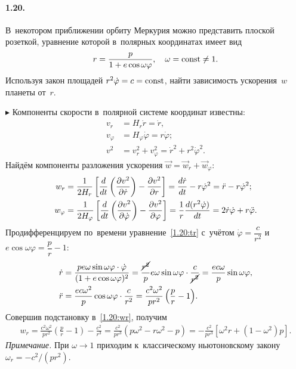 \documentclass{weekly}
\begin{document}

\paragraph{1.20.} В~некотором приближении орбиту Меркурия
можно представить плоской розеткой, уравнение которой
в~полярных координатах имеет вид
\begin{equation}\label{1.20:tr}
    r = \frac{p}{1+e\cos\omega\varphi}, \quad
    \omega = \mathrm{const} \neq 1.
\end{equation}
Используя закон площадей $r^2 \dot\varphi = c = \mathrm{const}$,
найти зависимость ускорения~$w$ планеты от~$r$.

$\blacktriangleright$ Компоненты скорости
в~полярной системе координат известны:
\begin{align}
    v_r &= H_r \dot r = \dot r, \label{1.20:vr}\\
    v_\varphi &= H_\varphi \dot\varphi = r \dot\varphi;
        \label{1.20:vphi}\\
    v^2 &= v_r^2 + v_\varphi^2 = \dot r^2 + r^2 \dot\varphi^2.
\end{align}
Найдём компоненты разложения ускорения
$\vec w = \vec w_r + \vec w_\varphi$:
\begin{align}
    w_r &= \frac{1}{2H_r}
            \left[ \frac{d }{d t} \left(\frac{\partial v^2}{\partial \dot r}\right) -
            \frac{\partial v^2}{\partial r} \right]
        = \frac{d \dot r}{d t} - r \dot\varphi^2
        = \ddot r - r\dot\varphi^2; \label{1.20:wr}\\
    w_\varphi &= \frac{1}{2H_\varphi}
            \left[ \frac{d }{d t} \left(\frac{\partial v^2}{\partial \dot\varphi}\right) -
            \frac{\partial v^2}{\partial \varphi} \right]
        = \frac{1}{r} \frac{d (r^2 \dot\varphi)}{d t}
        = 2 \dot r \dot\varphi + r \ddot\varphi. \label{1.20:wphi}
\end{align}
Продифференцируем по~времени уравнение~\eqref{1.20:tr} с~учётом
$\dot\varphi = \dfrac{c}{r^2}$ и
$e \cos\omega\varphi = \dfrac{p}{r} - 1$:
\begin{align}
    \dot r &= \frac{pe\omega \sin\omega\varphi \cdot \dot\varphi}
        {(1+e\cos\omega\varphi)^2}
        = \frac{\cancel{r^2}}{p} e\omega \sin\omega\varphi \cdot
            \frac{c}{\cancel{r^2}}
        = \frac{ec\omega}{p} \sin{\omega\varphi}, \\
    \ddot r &= \frac{ec\omega^2}{p} \cos\omega\varphi \cdot
        \frac{c}{r^2} = \frac{c^2 \omega^2}{pr^2}
        \left( \frac{p}{r} - 1 \right)\!.
\end{align}
Совершив подстановку в~\eqref{1.20:wr}, получим
\begin{align}
    w_r = \frac{c^2 \omega^2}{pr^2} \left(\frac{p}{r}-1\right) -
            \frac{c^2}{r^3}
        = \frac{c^2}{pr^3} \left( p \omega^2 - r \omega^2 - p \right)
        = -\frac{c^2}{pr^3} \left[ \omega^2 r +
            \left( 1-\omega^2 \right) p \right].
\end{align}
\textsl{Примечание.} При $\omega \to 1$ приходим к~классическому
ньютоновскому закону $\omega_r = -c^2/(pr^2)$.
\end{document}
